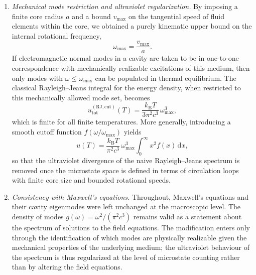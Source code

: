 \documentclass[11pt]{article}
\begin{document}
\begin{enumerate}
                \item \emph{Mechanical mode restriction and ultraviolet regularization.}
                By imposing a finite core radius $a$ and a bound $v_{\max}$ on the tangential
                speed of fluid elements within the core, we obtained a purely kinematic upper
                bound on the internal rotational frequency,
                \begin{equation}
                    \omega_{\max} = \frac{v_{\max}}{a}.
                \end{equation}
                If electromagnetic normal modes in a cavity are taken to be in one-to-one
                correspondence with mechanically realizable excitations of this medium, then
                only modes with $\omega \leq \omega_{\max}$ can be populated in thermal
                equilibrium. The classical Rayleigh--Jeans integral for the energy density,
                when restricted to this mechanically allowed mode set, becomes
                \begin{equation}
                    u_{\mathrm{tot}}^{(\mathrm{RJ,cut})}(T)
                    = \frac{k_{\mathrm B} T}{3\pi^2 c^3}\,\omega_{\max}^3,
                \end{equation}
                which is finite for all finite temperatures. More generally, introducing a
                smooth cutoff function $f(\omega/\omega_{\max})$ yields
                \begin{equation}
                    u(T)
                    = \frac{k_{\mathrm B}T}{\pi^2 c^3}\,\omega_{\max}^3
                    \int_0^\infty x^2 f(x)\,\mathrm{d}x,
                \end{equation}
                so that the ultraviolet divergence of the naive Rayleigh--Jeans spectrum is
                removed once the microstate space is defined in terms of circulation loops
                with finite core size and bounded rotational speeds.

                \item \emph{Consistency with Maxwell's equations.}
                Throughout, Maxwell's equations and their cavity eigenmodes were left
                unchanged at the macroscopic level. The density of modes
                $g(\omega) = \omega^2/(\pi^2 c^3)$ remains valid as a statement about the
                spectrum of solutions to the field equations. The modification enters only
                through the identification of which modes are physically realizable given the
                mechanical properties of the underlying medium; the ultraviolet behaviour of
                the spectrum is thus regularized at the level of microstate counting rather
                than by altering the field equations.
            \end{enumerate}
\end{document}
